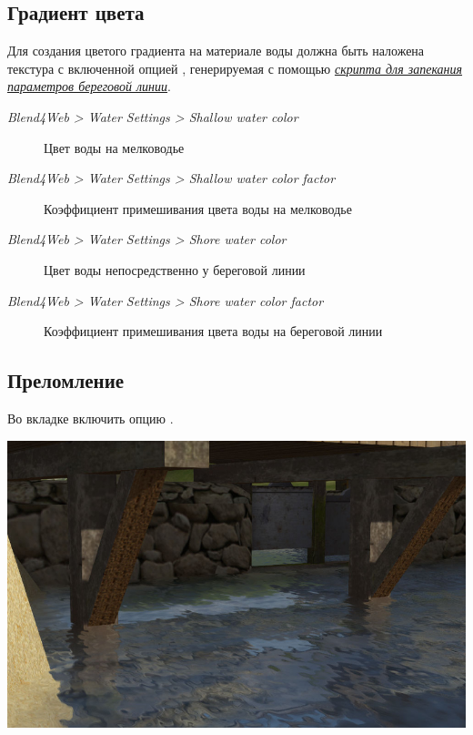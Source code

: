 \documentclass[a4paper,12pt,oneside]{sphinxmanual}
\begin{document}
\subsection{Градиент цвета}
\label{outdoor_rendering:id9}
Для создания цветого градиента на материале воды должна быть наложена текстура с включенной опцией , генерируемая с помощью {\hyperref[outdoor_rendering:shore-distance-bake]{\emph{скрипта для запекания параметров береговой линии}}}.
\begin{description}
\item[{\emph{Blend4Web \textgreater{} Water Settings \textgreater{} Shallow water color}}] \leavevmode
Цвет воды на мелководье

\item[{\emph{Blend4Web \textgreater{} Water Settings \textgreater{} Shallow water color factor}}] \leavevmode
Коэффициент примешивания цвета воды на мелководье

\item[{\emph{Blend4Web \textgreater{} Water Settings \textgreater{} Shore water color}}] \leavevmode
Цвет воды непосредственно у береговой линии

\item[{\emph{Blend4Web \textgreater{} Water Settings \textgreater{} Shore water color factor}}] \leavevmode
Коэффициент примешивания цвета воды на береговой линии

\end{description}


\subsection{Преломление}
\label{outdoor_rendering:id10}
Во вкладке  включить опцию .

{\hfill\includegraphics[width=1.000\linewidth]{water_refraction.jpg}\hfill}
\end{document}
